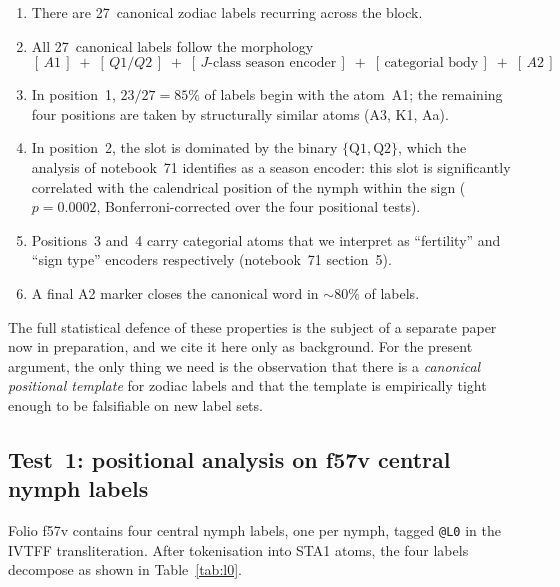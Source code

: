 \begin{enumerate}[itemsep=0pt,topsep=2pt]
\item There are 27~canonical zodiac labels recurring across the block.
\item All 27~canonical labels follow the morphology
\[
[\,A1\,] \;+\; [\,Q1/Q2\,] \;+\; [\,J\text{-class season encoder}\,] \;+\;
[\,\text{categorial body}\,] \;+\; [\,A2\,]
\]
\item In position~1, $23/27 = 85\%$ of labels begin with the atom~A1; the
remaining four positions are taken by structurally similar atoms (A3, K1,
Aa).
\item In position~2, the slot is dominated by the binary
$\{\mathrm{Q1}, \mathrm{Q2}\}$, which the analysis of notebook~71
identifies as a season encoder: this slot is significantly correlated
with the calendrical position of the nymph within the sign
($p = 0.0002$, Bonferroni-corrected over the four positional tests).
\item Positions~3 and~4 carry categorial atoms that we interpret as
``fertility'' and ``sign type'' encoders respectively (notebook~71
section~5).
\item A final A2 marker closes the canonical word in $\sim 80\%$ of
labels.
\end{enumerate}

The full statistical defence of these properties is the subject of a
separate paper now in preparation, and we cite it here only as
background. For the present argument, the only thing we need is the
observation that there is a \emph{canonical positional template} for
zodiac labels and that the template is empirically tight enough to be
falsifiable on new label sets.

\subsection{Test~1: positional analysis on f57v central nymph labels}
\label{sec:test_l0}

Folio f57v contains four central nymph labels, one per nymph, tagged
\texttt{@L0} in the IVTFF transliteration. After tokenisation into STA1
atoms, the four labels decompose as shown in Table~\ref{tab:l0}.

